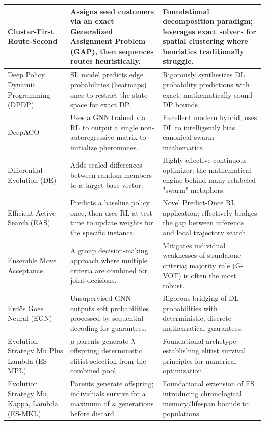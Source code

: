 \documentclass[orivec,runningheads]{llncs}
\begin{document}
\begin{center}
\begin{longtable}
\begin{center}
\begin{longtable}{
  >{\raggedright\arraybackslash}p{}
  >{\raggedright\arraybackslash}p{}
  >{\raggedright\arraybackslash}p{}
}
Cluster-First Route-Second & Assigns seed customers via an exact Generalized Assignment Problem (GAP), then sequences routes heuristically. & Foundational decomposition paradigm; leverages exact solvers for spatial clustering where heuristics traditionally struggle. \\ \midrule

Deep Policy Dynamic Programming (DPDP) & SL model predicts edge probabilities (heatmaps) once to restrict the state space for exact DP. & Rigorously synthesizes DL probability predictions with exact, mathematically sound DP bounds. \\ \midrule

DeepACO & Uses a GNN trained via RL to output a single non-autoregressive matrix to initialize pheromones. & Excellent modern hybrid; uses DL to intelligently bias canonical swarm mathematics. \\ \midrule

Differential Evolution (DE) & Adds scaled differences between random members to a target base vector. & Highly effective continuous optimizer; the mathematical engine behind many relabeled "swarm" metaphors. \\ \midrule

Efficient Active Search (EAS) & Predicts a baseline policy once, then uses RL at test-time to update weights for the specific instance. & Novel Predict-Once RL application; effectively bridges the gap between inference and local trajectory search. \\ \midrule

Ensemble Move Acceptance & A group decision-making approach where multiple criteria are combined for joint decisions. & Mitigates individual weaknesses of standalone criteria; majority rule (G-VOT) is often the most robust. \\ \midrule

Erdős Goes Neural (EGN) & Unsupervised GNN outputs soft probabilities processed by sequential decoding for guarantees. & Rigorous bridging of DL probabilities with deterministic, discrete mathematical guarantees. \\ \midrule

Evolution Strategy Mu Plus Lambda (ES-MPL) & $\mu$ parents generate $\lambda$ offspring; deterministic elitist selection from the combined pool. & Foundational archetype establishing elitist survival principles for numerical optimization. \\ \midrule

Evolution Strategy Mu, Kappa, Lambda (ES-MKL) & Parents generate offspring; individuals survive for a maximum of $\kappa$ generations before discard. & Foundational extension of ES introducing chronological memory/lifespan bounds to populations. \\ \midrule


\end{longtable}
\end{center}
\end{longtable}
\end{center}
\end{document}

